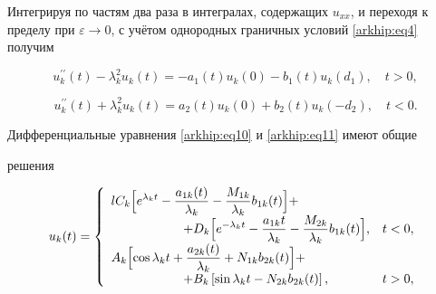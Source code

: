 Интегрируя по частям два раза в интегралах, содержащих $u_{xx}$, и переходя к пределу при $\varepsilon \to 0$, с учётом однородных граничных условий \eqref{arkhip:eq4} получим

\begin{equation} \label{arkhip:eq10}

u_{k} ^{\prime \prime}(t) - \lambda_{k} ^{2}

u_{k}(t) = - a_{1}(t)u_{k} \left( {0}

\right) - b_{1}(t)u_{k} \left( {d_{1}}

\right),\quad t > 0,

\end{equation}

\begin{equation} \label{arkhip:eq11}

u_{k} ^{\prime \prime}(t) + \lambda_{k} ^{2}

u_{k}(t) = a_{2}(t)u_{k}

\left({0}\right) + b_{2}(t)u_{k}

\left({-d_{2}}\right),\quad t < 0.

\end{equation}



\pagebreak



Дифференциальные уравнения \eqref{arkhip:eq10} и \eqref{arkhip:eq11} имеют общие

решения

\begin{equation} \label{arkhip:eq12}

u_{k} (t) = \left\{ 

\begin {array}{ll}

\displaystyle 

{l} C_{k}\Bigl[e^{\lambda_{k} t} - \frac{a_{1 k} (t)}{\lambda_{k}} - \frac{M_{1 k}}{\lambda_{k}}b_{1 k}(t)\Bigr] + \\

\displaystyle 

\hspace{2cm} +  D_{k}\Bigl[e^{-\lambda_{k} t} - \frac{a_{1 k} t}{\lambda_{k}} - \frac{M_{2 k}}{\lambda_{k}}b_{1 k}(t)\Bigr], & t < 0,

\\ 

\displaystyle 

A_{k}\Bigl[ \cos {\lambda_{k} t} + \frac{a_{2k} (t)}{\lambda_{k}} + N_{1 k} b_{2 k} (t)\Bigr] 

+ \\

\displaystyle 

\hspace{2cm} 

+   

B_{k} \left[\sin{\lambda_{k} t} - N_{2 k}b_{2 k}(t)\right],& t > 0,\\

\end{array} \right.

\end{equation}


